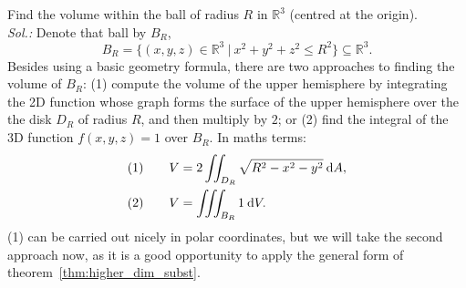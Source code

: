 \begin{example}
Find the volume within the ball of radius $R$ in $\mathbb{R}^3$ (centred at the origin).\\
{\it Sol.:} Denote that ball by $B_R$,
\[ B_R = \{ (x,y,z)\in\mathbb{R}^3 \: | \: x^2+y^2+z^2 \leq R^2 \} 
									\subseteq \mathbb{R}^3. \]
Besides using a basic geometry formula, there are two approaches to finding the volume of $B_R$: (1) compute the volume of the upper hemisphere by integrating the 2D function whose graph forms the surface of the upper hemisphere over the the disk $D_R$ of radius $R$, and then multiply by $2$; or (2) find the integral of the 3D function $f(x,y,z)=1$ over $B_R$. In maths terms:
\begin{equation*}
\begin{split}
(1) & \qquad V = 2\iint_{D_R} \sqrt{R^2-x^2-y^2} \: \mathrm{d} A,\\
(2) & \qquad V = \iiint_{B_R} 1 \: \mathrm{d} V.
\end{split}
\end{equation*}
(1) can be carried out nicely in polar coordinates, but we will take the second approach now, as it is a good opportunity to apply the general form of theorem~\ref{thm:higher_dim_subst}.


\end{example}
